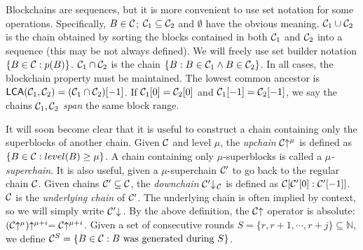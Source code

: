 Blockchains are sequences, but it is more convenient to use set notation for
some operations. Specifically, $B \in \mathcal{C}$; $\mathcal{C}_1 \subseteq \mathcal{C}_2$ and
$\emptyset$ have the obvious meaning. $\mathcal{C}_1 \cup \mathcal{C}_2$ is the chain
obtained by sorting the blocks contained in both $\mathcal{C}_1$ and $\mathcal{C}_2$ into
a sequence (this may be not always defined).
We will freely use set builder notation $\{B \in \mathcal{C}: p(B)\}$.
$\mathcal{C}_1 \cap \mathcal{C}_2$ is the
chain $\{B: B \in \mathcal{C}_1 \land B \in \mathcal{C}_2\}$. In all cases, the
blockchain property must be maintained. The lowest common ancestor is
$\textsf{LCA}(\mathcal{C}_1,
\mathcal{C}_2) = (\mathcal{C}_1 \cap \mathcal{C}_2)[-1]$.
If $\mathcal{C}_1[0] = \mathcal{C}_2[0]$ and $\mathcal{C}_1[-1] = \mathcal{C}_2[-1]$, we say the
chains $\mathcal{C}_1, \mathcal{C}_2$ \textit{span} the same block range.

It will soon become clear that it is useful to construct a chain containing only
the superblocks of another chain. Given $\mathcal{C}$ and level $\mu$, the
\textit{upchain} $\mathcal{C}\negthickspace\uparrow^\mu$ is defined as $\{B \in \mathcal{C}: level(B)
\geq \mu\}$. A chain containing only $\mu$-superblocks is called a
$\mu$\textit{-superchain}. It is also useful, given a $\mu$-superchain $\mathcal{C}'$
to go back to the regular chain $\mathcal{C}$. Given chains $\mathcal{C}' \subseteq
\mathcal{C}$, the \textit{downchain} $\mathcal{C}'\negthickspace\downarrow\,\!\!_{\mathcal{C}}$ is defined as
$\mathcal{C}[\mathcal{C}'[0]:\mathcal{C}'[-1]]$. $\mathcal{C}$ is the \textit{underlying chain} of
$\mathcal{C}'$. The underlying chain is often implied by context, so we will simply
write $\mathcal{C}'\negthickspace\downarrow\,$. By the above definition, the $\mathcal{C}\negthickspace\uparrow$
operator is absolute: $(\mathcal{C}\negthickspace\uparrow^\mu)\negthickspace\uparrow^{\mu + i} =
\mathcal{C}\negthickspace\uparrow^{\mu + i}$. Given a set of consecutive rounds $S = \{r, r + 1,
\cdots, r + j\} \subseteq \mathbb{N}$, we define $\mathcal{C}^S = \{B \in \mathcal{C}: B
\text{ was generated during } S\}$.
